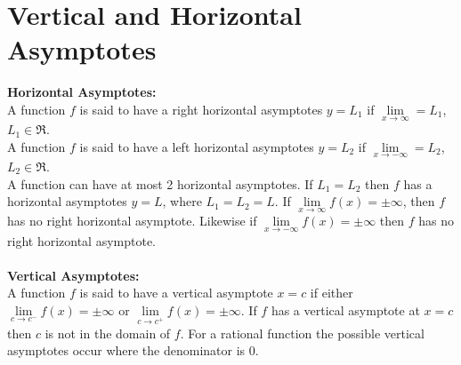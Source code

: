 \documentclass[14pt]{article}
\begin{document}
    \section{Vertical and Horizontal Asymptotes}
    \textbf{Horizontal Asymptotes:}\\
    A function $f$ is said to have a right horizontal asymptotes $y=L_1$ if $\lim \limits_{x\rightarrow\infty}=L_1$, $L_1\in\Re$.\\
    A function $f$ is said to have a left horizontal asymptotes $y=L_2$ if $\lim \limits_{x\rightarrow-\infty}=L_2$, $L_2\in\Re$.\\
    A function can have at most 2 horizontal asymptotes. If $L_1=L_2$ then $f$ has a horizontal asymptotes $y=L$, where $L_1=L_2=L$. If $\lim\limits_{x\rightarrow\infty}f(x)=\pm\infty$, then $f$ has no right horizontal asymptote. Likewise if  $\lim\limits_{x\rightarrow-\infty}f(x)=\pm\infty$ then $f$ has no right horizontal asymptote.\\\\
    \textbf{Vertical Asymptotes:}\\
    A function $f$ is said to have a vertical asymptote $x=c$ if either $\lim\limits_{c\rightarrow c^-}f(x)=\pm\infty$ or $\lim\limits_{c\rightarrow c^+}f(x)=\pm\infty$. 
    If $f$ has a vertical asymptote at $x=c$ then $c$ is not in the domain of $f$. 
    For a rational function the possible vertical asymptotes occur where the denominator is 0.
\end{document}
